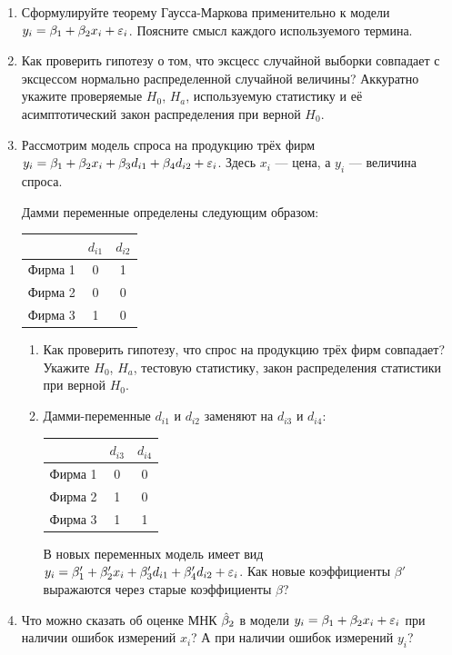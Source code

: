 \documentclass[12pt, a4paper]{article}\usepackage[]{graphicx}\usepackage[]{color}
\begin{document}
\begin{enumerate}
\item Сформулируйте теорему Гаусса-Маркова применительно к модели $y_i=\beta_1+\beta_2 x_i +\varepsilon_i$. Поясните смысл каждого используемого термина.

\item Как проверить гипотезу о том, что эксцесс случайной выборки совпадает с эксцессом нормально распределенной случайной величины? Аккуратно укажите проверяемые $H_0$, $H_a$, используемую статистику и её асимптотический закон распределения при верной $H_0$.

\item Рассмотрим модель спроса на продукцию трёх фирм $y_i=\beta_1+\beta_2 x_i +\beta_3 d_{i1} + \beta_4 d_{i2} + \varepsilon_i$. Здесь $x_i$ — цена, а $y_i$ — величина спроса.

Дамми переменные определены следующим образом:

\begin{tabular}{ccc}
 & $d_{i1}$ & $d_{i2}$  \\
\hline
Фирма 1 & 0 & 1  \\
Фирма 2 & 0 & 0  \\
Фирма 3 & 1 & 0  \\
\end{tabular}

\begin{enumerate}
\item Как проверить гипотезу, что спрос на продукцию трёх фирм совпадает? Укажите $H_0$, $H_a$, тестовую статистику, закон распределения статистики при верной $H_0$.
\item Дамми-переменные $d_{i1}$ и $d_{i2}$ заменяют на $d_{i3}$ и $d_{i4}$:

\begin{tabular}{ccc}
  & $d_{i3}$ & $d_{i4}$ \\
\hline
Фирма 1 &  0 & 0 \\
Фирма 2 &  1 & 0 \\
Фирма 3 &  1 & 1 \\
\end{tabular}


В новых переменных модель имеет вид $y_i=\beta_1'+\beta_2' x_i +\beta_3' d_{i1} + \beta_4' d_{i2} + \varepsilon_i$. Как новые коэффициенты $\beta'$ выражаются через старые коэффициенты $\beta$?
\end{enumerate}



\item Что можно сказать об оценке МНК $\hat{\beta}_2$  в модели $y_i=\beta_1+\beta_2 x_i +\varepsilon_i$ при наличии ошибок измерений $x_i$? А при наличии ошибок измерений $y_i$?


\end{enumerate}
\end{document}
